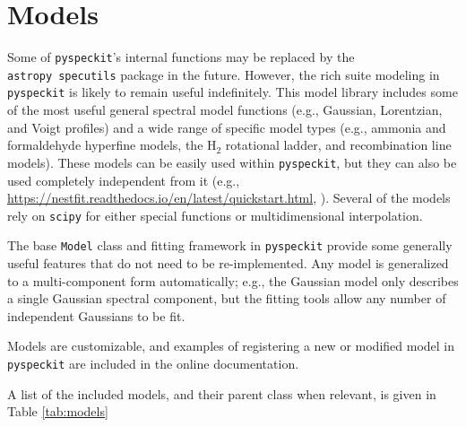 \documentclass[twocolumn,linenumbers]{aastex63}
\newcommand{\pyspeckit}{\texttt{pyspeckit}\xspace}
\newcommand{\astropy}{\texttt{astropy}\xspace}
\newcommand{\hh}{\ensuremath{\mathrm{H}_2}\xspace}
\begin{document}
\section{Models}
\label{sec:models}
Some of \pyspeckit's internal functions may be replaced by the \astropy\
\texttt{specutils} package in the future.  However, the rich suite modeling in
\pyspeckit is likely to remain useful indefinitely.  This model library
includes some of the most useful general spectral model functions (e.g.,
Gaussian, Lorentzian, and Voigt profiles) and a wide range of specific model
types (e.g., ammonia and formaldehyde hyperfine models, the \hh rotational
ladder, and recombination line models).  These models can be easily used
within \pyspeckit, but they can also be used completely independent from
it (e.g., \url{https://nestfit.readthedocs.io/en/latest/quickstart.html}, \citealt{brian_svoboda_2021_4470028}).
Several of the models rely on \texttt{scipy} \citep{Virtanen2020} for either special functions or multidimensional interpolation.

The base \texttt{Model} class and fitting framework in \pyspeckit provide some
generally useful features that do not need to be re-implemented.  Any model is
generalized to a multi-component form automatically; e.g., the Gaussian model
only describes a single Gaussian spectral component, but the fitting tools
allow any number of independent Gaussians to be fit.

Models are customizable, and examples of registering a new or modified
model in \pyspeckit are included in the online documentation.

A list of the included models, and their parent class when relevant,
is given in Table \ref{tab:models}
\end{document}

